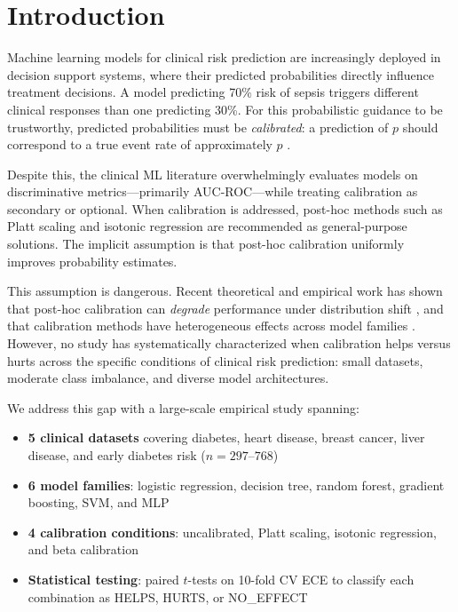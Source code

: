 \documentclass[preprint,12pt]{elsarticle}
\begin{document}
\linenumbers

\section{Introduction}
\label{sec:intro}

Machine learning models for clinical risk prediction are increasingly deployed in decision support systems, where their predicted probabilities directly influence treatment decisions. A model predicting 70\% risk of sepsis triggers different clinical responses than one predicting 30\%. For this probabilistic guidance to be trustworthy, predicted probabilities must be \emph{calibrated}: a prediction of $p$ should correspond to a true event rate of approximately $p$ \citep{vancalster2019}.

Despite this, the clinical ML literature overwhelmingly evaluates models on discriminative metrics---primarily AUC-ROC---while treating calibration as secondary or optional. When calibration is addressed, post-hoc methods such as Platt scaling \citep{platt1999} and isotonic regression \citep{zadrozny2002} are recommended as general-purpose solutions. The implicit assumption is that post-hoc calibration uniformly improves probability estimates.

This assumption is dangerous. Recent theoretical and empirical work has shown that post-hoc calibration can \emph{degrade} performance under distribution shift \citep{rethinking2024}, and that calibration methods have heterogeneous effects across model families \citep{niculescu2005}. However, no study has systematically characterized when calibration helps versus hurts across the specific conditions of clinical risk prediction: small datasets, moderate class imbalance, and diverse model architectures.

We address this gap with a large-scale empirical study spanning:

\begin{itemize}
    \item \textbf{5 clinical datasets} covering diabetes, heart disease, breast cancer, liver disease, and early diabetes risk ($n=297$--$768$)
    \item \textbf{6 model families}: logistic regression, decision tree, random forest, gradient boosting, SVM, and MLP
    \item \textbf{4 calibration conditions}: uncalibrated, Platt scaling, isotonic regression, and beta calibration
    \item \textbf{Statistical testing}: paired $t$-tests on 10-fold CV ECE to classify each combination as HELPS, HURTS, or NO\_EFFECT
\end{itemize}
\end{document}

